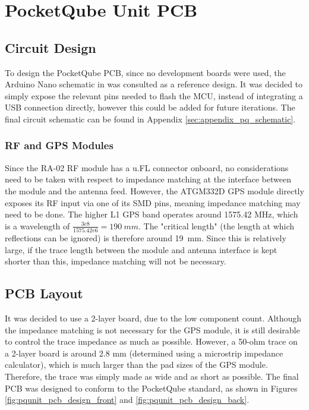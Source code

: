 \graphicspath{{./figures}}

\section{PocketQube Unit PCB}
\subsection{Circuit Design}
To design the PocketQube PCB, since no development boards were used, the Arduino Nano schematic in \cite{design-arduinoNano} was consulted as a reference design. It was decided to simply expose the relevant pins needed to flash the MCU, instead of integrating a USB connection directly, however this could be added for future iterations. The final circuit schematic can be found in Appendix \ref{sec:appendix_pq_schematic}.

\subsubsection{RF and GPS Modules}
Since the RA-02 RF module has a u.FL connector onboard, no considerations need to be taken with respect to impedance matching at the interface between the module and the antenna feed. However, the ATGM332D GPS module directly exposes its RF input via one of its SMD pins, meaning impedance matching may need to be done. The higher L1 GPS band operates around 1575.42 MHz, which is a wavelength of $\frac{3e8}{1575.42e6} = \SI{190}{mm}$. The "critical length" (the length at which reflections can be ignored) is therefore around \SI{19}{mm}. Since this is relatively large, if the trace length between the module and antenna interface is kept shorter than this, impedance matching will not be necessary.

\subsection{PCB Layout}
It was decided to use a 2-layer board, due to the low component count. Although the impedance matching is not necessary for the GPS module, it is still desirable to control the trace impedance as much as possible. However, a 50-ohm trace on a 2-layer board is around 2.8 mm (determined using a microstrip impedance calculator), which is much larger than the pad sizes of the GPS module. Therefore, the trace was simply made as wide and as short as possible. The final PCB was designed to conform to the PocketQube standard, as shown in Figures \ref{fig:pqunit_pcb_design_front} and \ref{fig:pqunit_pcb_design_back}.

